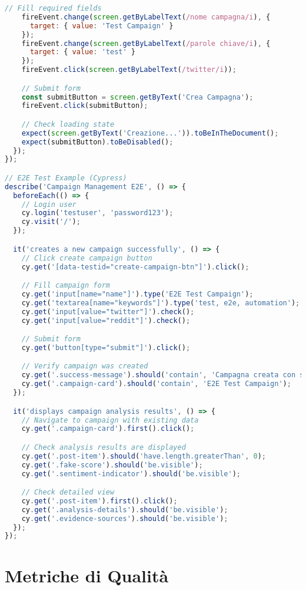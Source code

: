 \documentclass[12pt,a4paper]{report}
\begin{document}
\begin{lstlisting}[language=javascript, caption=Example React Component Tests]
    // Fill required fields
    fireEvent.change(screen.getByLabelText(/nome campagna/i), {
      target: { value: 'Test Campaign' }
    });
    fireEvent.change(screen.getByLabelText(/parole chiave/i), {
      target: { value: 'test' }
    });
    fireEvent.click(screen.getByLabelText(/twitter/i));

    // Submit form
    const submitButton = screen.getByText('Crea Campagna');
    fireEvent.click(submitButton);

    // Check loading state
    expect(screen.getByText('Creazione...')).toBeInTheDocument();
    expect(submitButton).toBeDisabled();
  });
});

// E2E Test Example (Cypress)
describe('Campaign Management E2E', () => {
  beforeEach(() => {
    // Login user
    cy.login('testuser', 'password123');
    cy.visit('/');
  });

  it('creates a new campaign successfully', () => {
    // Click create campaign button
    cy.get('[data-testid="create-campaign-btn"]').click();

    // Fill campaign form
    cy.get('input[name="name"]').type('E2E Test Campaign');
    cy.get('textarea[name="keywords"]').type('test, e2e, automation');
    cy.get('input[value="twitter"]').check();
    cy.get('input[value="reddit"]').check();

    // Submit form
    cy.get('button[type="submit"]').click();

    // Verify campaign was created
    cy.get('.success-message').should('contain', 'Campagna creata con successo');
    cy.get('.campaign-card').should('contain', 'E2E Test Campaign');
  });

  it('displays campaign analysis results', () => {
    // Navigate to campaign with existing data
    cy.get('.campaign-card').first().click();

    // Check analysis results are displayed
    cy.get('.post-item').should('have.length.greaterThan', 0);
    cy.get('.fake-score').should('be.visible');
    cy.get('.sentiment-indicator').should('be.visible');

    // Check detailed view
    cy.get('.post-item').first().click();
    cy.get('.analysis-details').should('be.visible');
    cy.get('.evidence-sources').should('be.visible');
  });
});
\end{lstlisting}

\section{Metriche di Qualità}
\end{document}
